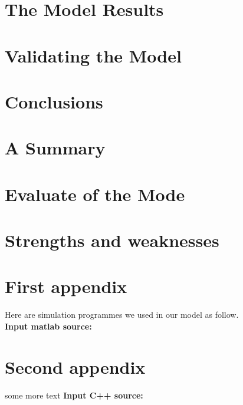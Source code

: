 \documentclass{mcmthesis}
\begin{document}

\section{The Model Results}
\lipsum[6]

\section{Validating the Model}
\lipsum[9]

\section{Conclusions}
\lipsum[6]

\section{A Summary}
\lipsum[6]

\section{Evaluate of the Mode}

\section{Strengths and weaknesses}
\lipsum[12]



\begin{appendices}

\section{First appendix}

\lipsum[13]

Here are simulation programmes we used in our model as follow.\\

\textbf{\textcolor[rgb]{0.98,0.00,0.00}{Input matlab source:}}

\section{Second appendix}

some more text \textcolor[rgb]{0.98,0.00,0.00}{\textbf{Input C++ source:}}

\end{appendices}
\end{document}
